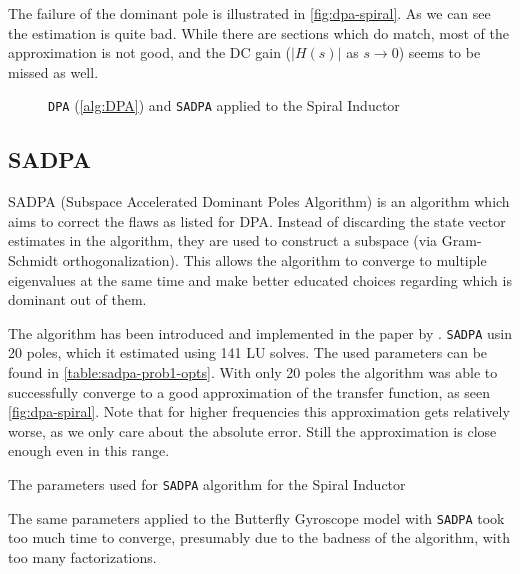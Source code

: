\documentclass{article}
\newlength\figurewidth
\begin{document}
	The failure of the dominant pole is illustrated in \autoref{fig:dpa-spiral}. As we can see the estimation is quite bad. While there are sections which do match, most of the approximation is not good, and the DC gain ($\left|H(s)\right|$ as $s \to 0$) seems to be missed as well. 
	
	\begin{figure}[h!]
		\centering
		\setlength{\figurewidth}{2\textwidth}
		
		\caption{\texttt{DPA} (\autoref{alg:DPA}) and \texttt{SADPA} applied to the Spiral Inductor}\label{fig:dpa-spiral}
	\end{figure}
	
	
	\subsection*{SADPA}
	SADPA (Subspace Accelerated Dominant Poles Algorithm) is an algorithm which aims to correct the flaws as listed for DPA. Instead of discarding the state vector estimates in the algorithm, they are used to construct a subspace (via Gram-Schmidt orthogonalization). This allows the algorithm to converge to multiple eigenvalues at the same time and make better educated choices regarding which is dominant out of them. 
	
	The algorithm has been introduced and implemented in the paper by \textcite{sadpa2006rommes}. \texttt{SADPA} usin 20 poles, which it estimated using 141 LU solves. The used parameters can be found in \autoref{table:sadpa-prob1-opts}. With only 20 poles the algorithm was able to successfully converge to a good approximation of the transfer function, as seen \autoref{fig:dpa-spiral}. Note that for higher frequencies this approximation gets relatively worse, as we only care about the absolute error. Still the approximation is close enough even in this range.
	
	\begin{table}[h!]
		\centering
		
		\caption{The parameters used for \texttt{SADPA} algorithm for the Spiral Inductor}\label{table:sadpa-prob1-opts}
	\end{table}
	
	The same parameters applied to the Butterfly Gyroscope model with \texttt{SADPA} took too much time to converge, presumably due to the badness of the algorithm, with too many factorizations.
\end{document}
